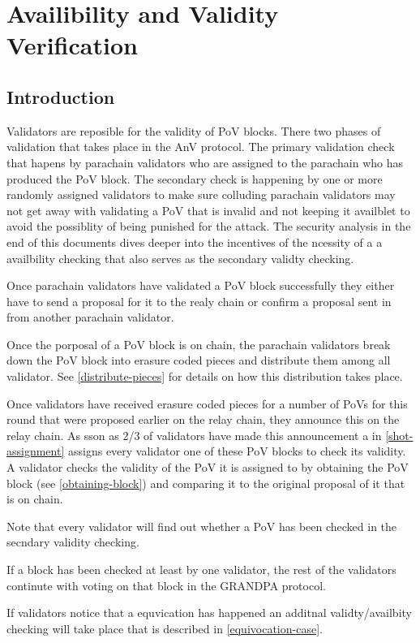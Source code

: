 \chapter{Availibility and Validity Verification}

\section{Introduction}
Validators are reposible for the validity of PoV blocks. There two phases of validation that takes place in the AnV protocol. The primary validation check that hapens by parachain validators who are assigned to the parachain who has produced the PoV block. The secondary check is happening by one or more randomly assigned validators to make sure colluding parachain validators may not get away with validating a PoV that is invalid and not keeping it availblet to avoid the possiblity of being punished for the attack. The security analysis in the end of this documents dives deeper into the incentives of the ncessity of a a availbility checking that also serves as the secondary validty checking. 

Once parachain validators have validated a PoV block successfully they either have to send a proposal for it to the realy chain or confirm a proposal sent in from another parachain validator. 

Once the porposal of a PoV block is on chain, the parachain validators break down the PoV block into erasure coded pieces and distribute them among all validator. See \ref{distribute-pieces} for details on how this distribution takes place.

Once validators have received erasure coded pieces for a number of PoVs for this round that were proposed earlier on the relay chain, they announce this on the relay chain. As sson as 2/3 of validators have made this announcement a in \ref{shot-assignment} assigns every validator one of these PoV blocks to check its validity. A validator checks the validity of the PoV it is assigned to by obtaining the PoV block (see \ref{obtaining-block}) and comparing it to the original proposal of it that is on chain. 

Note that every validator will find out whether a PoV has been checked in the secndary validity checking. 

If a block has been checked at least by one validator, the rest of the validators continute with voting on that block in the GRANDPA protocol. 

If validators notice that a equvication has happened an additnal validty/availbity checking will take place that is described in \ref{equivocation-case}. 



